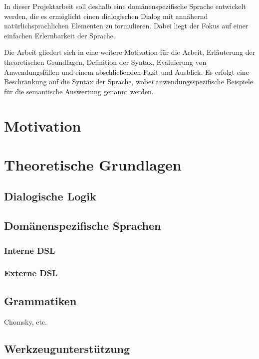\documentclass[11pt,a4paper,bibtotocnumbered]{scrreprt}
\begin{document}
In dieser Projektarbeit soll deshalb eine domänenspezifische Sprache entwickelt werden, die es ermöglicht einen dialogischen Dialog mit annähernd natürlichsprachlichen Elementen zu formulieren. 
Dabei liegt der Fokus auf einer einfachen Erlernbarkeit der Sprache.

Die Arbeit gliedert sich in eine weitere Motivation für die Arbeit, Erläuterung der theoretischen Grundlagen, Definition der Syntax, Evaluierung von Anwendungsfällen und einem abschließenden Fazit und Ausblick.
Es erfolgt eine Beschränkung auf die Syntax der Sprache, wobei anwendungsspezifische Beispiele für die semantische Auswertung genannt werden.

\chapter{Motivation} %


\chapter{Theoretische Grundlagen}  %

\section{Dialogische Logik}


\section{Domänenspezifische Sprachen} 

\subsection{Interne DSL}

\subsection{Externe DSL}

\section{Grammatiken} 
Chomsky, etc.

\section{Werkzeugunterstützung} 
\end{document}
